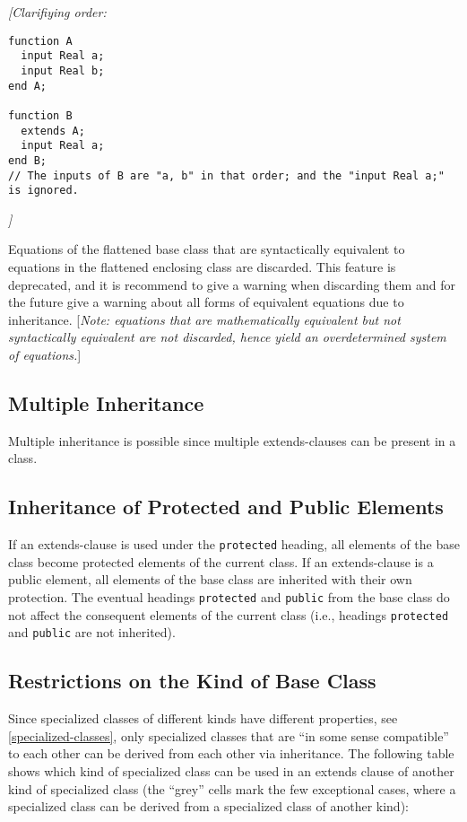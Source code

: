 \emph{{[}Clarifiying order:}
\begin{lstlisting}[language=modelica]
function A
  input Real a;
  input Real b;
end A;

function B
  extends A;
  input Real a;
end B;
// The inputs of B are "a, b" in that order; and the "input Real a;" is ignored.
\end{lstlisting}
\emph{{]}}

Equations of the flattened base class that are syntactically equivalent
to equations in the flattened enclosing class are discarded. This
feature is deprecated, and it is recommend to give a warning when
discarding them and for the future give a warning about all forms of
equivalent equations due to inheritance. {[}\emph{Note: equations that
are mathematically equivalent but not syntactically equivalent are not
discarded, hence yield an overdetermined system of equations.}{]}

\subsection{Multiple Inheritance}

Multiple inheritance is possible since multiple extends-clauses can be
present in a class.

\subsection{Inheritance of Protected and Public Elements}

If an extends-clause is used under the \lstinline!protected! heading, all elements
of the base class become protected elements of the current class. If an
extends-clause is a public element, all elements of the base class are
inherited with their own protection. The eventual headings \lstinline!protected! and
\lstinline!public! from the base class do not affect the consequent elements of the
current class (i.e., headings \lstinline!protected! and \lstinline!public! are not inherited).

\subsection{Restrictions on the Kind of Base Class}

Since specialized classes of different kinds have different properties,
see \autoref{specialized-classes}, only specialized classes that are ``in some sense
compatible'' to each other can be derived from each other via
inheritance. The following table shows which kind of specialized class
can be used in an extends clause of another kind of specialized class
(the ``grey'' cells mark the few exceptional cases, where a specialized
class can be derived from a specialized class of another kind):

